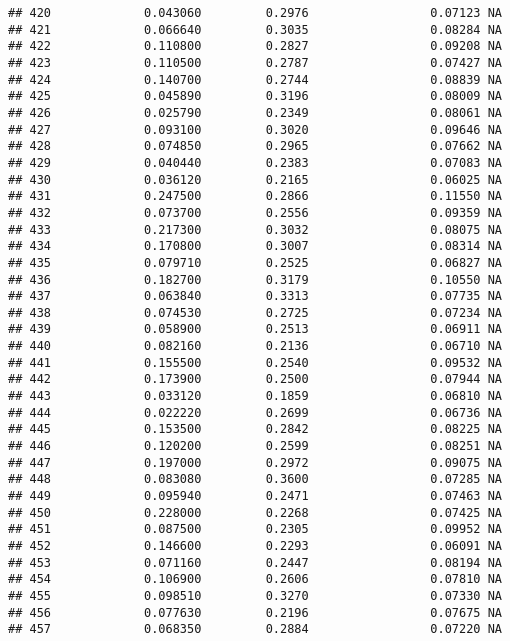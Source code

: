 \documentclass[
]{article}
\begin{document}
\begin{verbatim}
## 420             0.043060         0.2976                 0.07123 NA
## 421             0.066640         0.3035                 0.08284 NA
## 422             0.110800         0.2827                 0.09208 NA
## 423             0.110500         0.2787                 0.07427 NA
## 424             0.140700         0.2744                 0.08839 NA
## 425             0.045890         0.3196                 0.08009 NA
## 426             0.025790         0.2349                 0.08061 NA
## 427             0.093100         0.3020                 0.09646 NA
## 428             0.074850         0.2965                 0.07662 NA
## 429             0.040440         0.2383                 0.07083 NA
## 430             0.036120         0.2165                 0.06025 NA
## 431             0.247500         0.2866                 0.11550 NA
## 432             0.073700         0.2556                 0.09359 NA
## 433             0.217300         0.3032                 0.08075 NA
## 434             0.170800         0.3007                 0.08314 NA
## 435             0.079710         0.2525                 0.06827 NA
## 436             0.182700         0.3179                 0.10550 NA
## 437             0.063840         0.3313                 0.07735 NA
## 438             0.074530         0.2725                 0.07234 NA
## 439             0.058900         0.2513                 0.06911 NA
## 440             0.082160         0.2136                 0.06710 NA
## 441             0.155500         0.2540                 0.09532 NA
## 442             0.173900         0.2500                 0.07944 NA
## 443             0.033120         0.1859                 0.06810 NA
## 444             0.022220         0.2699                 0.06736 NA
## 445             0.153500         0.2842                 0.08225 NA
## 446             0.120200         0.2599                 0.08251 NA
## 447             0.197000         0.2972                 0.09075 NA
## 448             0.083080         0.3600                 0.07285 NA
## 449             0.095940         0.2471                 0.07463 NA
## 450             0.228000         0.2268                 0.07425 NA
## 451             0.087500         0.2305                 0.09952 NA
## 452             0.146600         0.2293                 0.06091 NA
## 453             0.071160         0.2447                 0.08194 NA
## 454             0.106900         0.2606                 0.07810 NA
## 455             0.098510         0.3270                 0.07330 NA
## 456             0.077630         0.2196                 0.07675 NA
## 457             0.068350         0.2884                 0.07220 NA

\end{verbatim}
\end{document}
